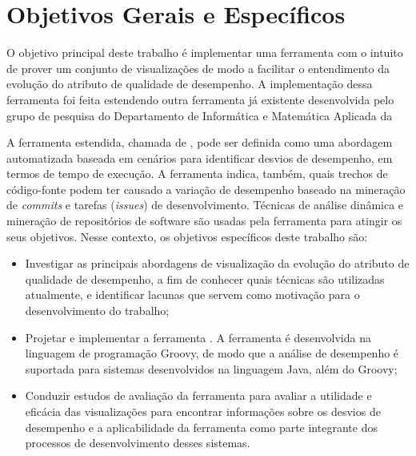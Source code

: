 
\section{Objetivos Gerais e Específicos} \label{sec:objetivos-gerais-especificos}

O objetivo principal deste trabalho é implementar uma ferramenta com o intuito de prover um conjunto de visualizações de modo a facilitar o entendimento da evolução do atributo de qualidade de desempenho. A implementação dessa ferramenta foi feita estendendo outra ferramenta já existente desenvolvida pelo grupo de pesquisa do Departamento de Informática e Matemática Aplicada da 

A ferramenta estendida, chamada de \textit{\perfMinerName} \cite{Pinto2015}, pode ser definida como uma abordagem automatizada baseada em cenários para identificar desvios de desempenho, em termos de tempo de execução. A ferramenta indica, também, quais trechos de código-fonte podem ter causado a variação de desempenho baseado na mineração de \textit{commits} e tarefas (\textit{issues}) de desenvolvimento. Técnicas de análise dinâmica e mineração de repositórios de software são usadas pela ferramenta para atingir os seus objetivos. Nesse contexto, os objetivos específicos deste trabalho são:
\begin{itemize}
	\item Investigar as principais abordagens de visualização da evolução do atributo de qualidade de desempenho, a fim de conhecer quais técnicas são utilizadas atualmente, e identificar lacunas que servem como motivação para o desenvolvimento do trabalho;
	\item Projetar e implementar a ferramenta \textit{{\toolName}}. A ferramenta é desenvolvida na linguagem de programação Groovy, de modo que a análise de desempenho é suportada para sistemas desenvolvidos na linguagem Java, além do Groovy;
	\item Conduzir estudos de avaliação da ferramenta para avaliar a utilidade e eficácia das visualizações para encontrar informações sobre os desvios de desempenho e a aplicabilidade da ferramenta como parte integrante dos processos de desenvolvimento desses sistemas.
\end{itemize}

